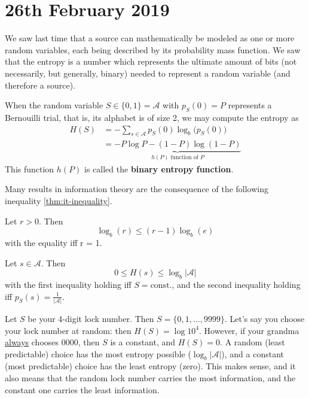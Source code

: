 \documentclass{report}
\begin{document}
\section{26th February 2019}
We saw last time that a source can mathematically be modeled as one or more random variables, each being described by its probability mass function. We saw that the entropy is a number which represents the ultimate amount of bits (not necessarily, but generally, binary) needed to represent a random variable (and therefore a source).

\begin{defn} When the random variable $S \in \{0, 1\} = \mathcal A$ with $p_S(0) = P$ represents a Bernouilli trial, that is, its alphabet is of size 2, we may compute the entropy as
\begin{align*}
	H(S) &= - \sum_{s \in \mathcal A} p_S(0) \log_b \bigl(p_S(0)\bigr) \\
	&= \underbrace{-P \log P - (1-P) \log(1-P)}_{h(P) \text{ function of } P}
\end{align*}
This function $h(P)$ is called the \textbf{binary entropy function}. 
\end{defn}

Many results in information theory are the consequence of the following inequality \ref{thm:it-inequality}.
\begin{thm}[IT inequality]\label{thm:it-inequality}
Let $r > 0$. Then
\begin{equation}
	\log_b(r) \leq (r-1) \log_b (e) %
\end{equation}
with the equality iff r = 1.
\end{thm}

\begin{thm}
Let $s \in \mathcal A$. Then
\begin{equation}
	0 \leq H(s) \leq \log_b |\mathcal A|
\end{equation}
with the first inequality holding iff $S=\text{const.}$, and the second inequality holding iff $p_S(s)=\frac{1}{|\mathcal A|}$.
\end{thm}

\begin{exmp}
	Let $S$ be your 4-digit lock number. Then $S = \{0, 1, \ldots, 9999\}$. Let's say you choose your lock number at random: then $H(S) = \log 10^4$. However, if your grandma \ul{always} chooses $0000$, then $S$ is a constant, and $H(S) = 0$. A random (least predictable) choice has the most entropy possible ($\log_b |\mathcal A|$), and a constant (most predictable) choice has the least entropy (zero). This makes sense, and it also means that the random lock number carries the most information, and the constant one carries the least information.
\end{exmp}
\end{document}
